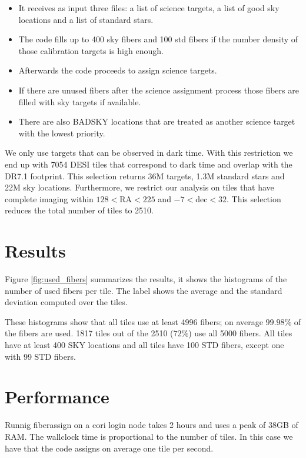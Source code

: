 \documentclass{article}
\begin{document}
\begin{itemize}
\item It receives as input three files: a list of science targets, a
  list of good sky locations and a list of standard
  stars. 
\item The code fills up to 400 sky fibers and 100 std fibers if the
  number density of those calibration targets is high enough.
\item Afterwards the code proceeds to assign science targets.
\item If there are unused fibers after the science assignment process
  those fibers are filled with sky targets if available.
\item There are also BADSKY locations that are treated as another
  science target with the lowest priority.
\end{itemize}



We only use targets that can be observed in dark time. 
With this restriction we end up with 7054 DESI tiles that correspond
to dark time and overlap with the DR7.1 footprint. 
This selection returns 36M targets, 1.3M standard stars and
22M sky locations.
Furthermore, we restrict our analysis on tiles that have complete imaging
within $128<$RA$<225$ and $-7<$dec$<32$.  This selection reduces
the total number of tiles to 2510. 

\section{Results}

Figure \ref{fig:used_fibers} summarizes the results, it shows the
histograms of the number of used fibers per tile.
The label shows the average and the standard deviation computed over
the tiles. 

These histograms show that all tiles use at least 4996 fibers; 
on average $99.98\%$ of the fibers are used.
1817 tiles out of the 2510 ($72\%$) use all 5000 fibers.
All tiles have at least 400 SKY locations and all tiles have 100 STD
fibers, except one with 99 STD fibers. 

\section{Performance}
Runnig fiberassign on a cori login node takes 2 hours and  uses a
peak of 38GB of RAM.
The wallclock time is proportional to the number
of tiles. In this case we have that the code assigns on average one
tile per second. 
\end{document}

